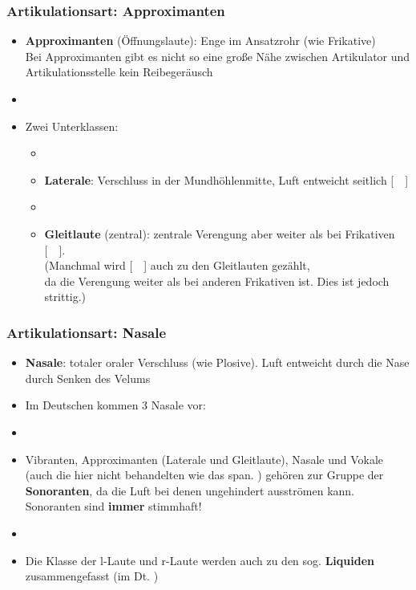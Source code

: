 \begin{frame}
\frametitle{Artikulationsart: Approximanten}

		\begin{itemize}
			\item \textbf{Approximanten} (Öffnungslaute): Enge im Ansatzrohr (wie Frikative)\\
			Bei Approximanten gibt es nicht so eine große Nähe zwischen Artikulator und Artikulationsstelle \ras kein Reibegeräusch
			\item[]
			\item[] Zwei Unterklassen:
			
			\begin{itemize}
				\item[]
				\item \textbf{Laterale}: Verschluss in der Mundhöhlenmitte, Luft entweicht seitlich [~~]
				\item[]
				\item \textbf{Gleitlaute} (zentral): zentrale Verengung aber weiter als bei Frikativen [~~].\\
				(Manchmal wird [~~] auch zu den Gleitlauten gezählt,\\
                                  da die Verengung weiter als bei anderen Frikativen ist. Dies ist jedoch strittig.)
			\end{itemize}
			
		\end{itemize}	

\end{frame}


\begin{frame}
\frametitle{Artikulationsart: Nasale}
		\begin{itemize}
			\item \textbf{Nasale}: totaler oraler Verschluss (wie Plosive). Luft entweicht durch die Nase durch Senken des Velums\\
			\item[] Im Deutschen kommen 3 Nasale vor: \textipa{[ m, n, N ]}

		\item[]
		\item Vibranten, Approximanten (Laterale und Gleitlaute), Nasale und Vokale (auch die hier nicht behandelten  wie das span. \textipa{[~R~]}) gehören zur Gruppe der \textbf{Sonoranten}, da die Luft bei denen ungehindert ausströmen kann. Sonoranten sind \textbf{immer} stimmhaft!
		\item[]
		\item Die Klasse der l-Laute und r-Laute werden auch zu den sog. \textbf{Liquiden} zusammengefasst (im Dt. \textipa{[ l, r, \textscr ]})
	\end{itemize}
	
\end{frame}


